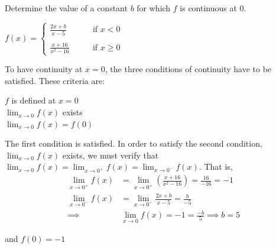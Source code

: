 \documentclass[nooutcomes,handout]{ximera}
\begin{document}
\begin{problem}
Determine the value of a constant $b$ for which $f$ is continuous at $0$.
	
	$f(x) =   \left\{ \begin{array}{ll}
	\frac{2x+b}{x-5}	 	&	\qquad \text{if } x < 0	\\ \\
	\frac{x+16}{x^2-16}		&	\qquad \text{if } x \ge 0	\end{array} \right.  $

	\begin{freeResponse}
	
To have continuity at $x = 0$, the three conditions of continuity have to be satisfied.  These criteria are:
	\begin{center}
	  $f$ is defined at $x = 0$\\

     	 $\lim_{x \to 0} f(x)$ exists\\

    	  $\lim_{x \to 0} f(x) = f(0)$
	\end{center}

The first condition is satisfied.  In order to satisfy the second condition,  $\lim_{x \to 0} f(x)$ exists, we must verify that $\lim_{x \to 0} f(x)=\lim_{x \to 0^+} f(x)=\lim_{x \to 0^-} f(x)$.
That is, 
	\begin{align*}
	\lim_{x \to 0^+} f(x)&=\lim_{x \to 0^+} \left(\frac{x+16}{x^2-16}\right)=\frac{16}{-16}=-1\\
	\lim_{x \to 0^-} f(x)&=\lim_{x \to 0^-}\frac{2x+b}{x-5}=\frac{b}{-5}\\
	\implies & \lim_{x \to 0} f(x)=-1=\frac{-b}{5} \implies b=5
	\end{align*}

and $f(0)=-1$
	
	\end{freeResponse}
\end{problem}
	
	
\end{document}
